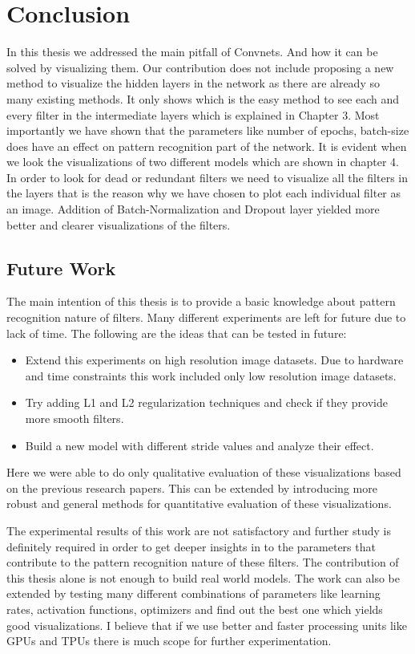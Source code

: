 \chapter{Conclusion}\label{chap:conclusion}
 In this thesis we addressed the main pitfall of Convnets. And how it can be solved by visualizing them.  Our contribution does not include proposing a new method to visualize the hidden layers in the network as there are already so many existing methods. It only shows which is the easy method to see each and every filter in the intermediate layers which is explained in Chapter 3. Most importantly we have shown that the parameters like number of epochs, batch-size does have an effect on pattern recognition part of the network. It is evident when we look the visualizations of two different models which are shown in chapter 4. In order to look for dead or redundant filters we need to visualize all the filters in the layers that is the reason why we have chosen to plot each individual filter as an image. 
 Addition of Batch-Normalization and Dropout layer yielded more better and clearer visualizations of the filters.  
 
 \section{Future Work}
The main intention of this thesis is to provide a basic knowledge about pattern recognition nature of filters. Many different experiments are left for future due to lack of time. The following are the ideas that can be tested in future:
\begin{itemize}
    \item Extend this experiments on high resolution image datasets. Due to hardware and time constraints this work included only low resolution image datasets.
    \item Try adding L1 and L2 regularization techniques and check if they provide more smooth filters.  
    \item Build a new model with different stride values and analyze their effect.
   
\end{itemize}



\noindent Here we were able to do only qualitative evaluation of these visualizations based on the previous research papers. This can be extended by introducing more robust and general methods for quantitative evaluation of these visualizations. 

The experimental results of this work are not satisfactory and further study is definitely required in order to get deeper insights in to the parameters that contribute to the pattern recognition nature of these filters. The contribution of this thesis alone is not enough to build real world models. The work can also be extended by testing many different combinations of parameters like learning rates, activation functions, optimizers and find out the best one which yields good visualizations. I believe that if we use better and faster processing units like GPUs and TPUs there is much scope for further experimentation.


